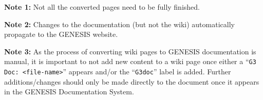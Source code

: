 \documentclass[12pt]{article}
\begin{document}
{\bf Note 1:} Not all the converted pages need to be fully finished.

{\bf Note 2:} Changes to the documentation (but not the wiki) automatically propagate to the GENESIS website.

{\bf Note 3:} As the process of converting wiki pages to GENESIS documentation is manual, it is important to not add new content to a wiki page once either a ``{\tt G3 Doc: <file-name>}'' appears and/or the ``{\tt G3doc}'' label is added. Further additions/changes should only be made directly to the document once it appears in the GENESIS Documentation System.
\end{document}
